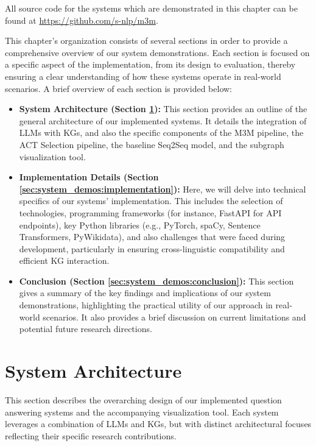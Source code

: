 All source code for the systems which are demonstrated in this chapter can be found at \url{https://github.com/s-nlp/m3m}.

This chapter's organization consists of several sections in order to provide a comprehensive overview of our system demonstrations. Each section is focused on a specific aspect of the implementation, from its design to evaluation, thereby ensuring a clear understanding of how these systems operate in real-world scenarios. A brief overview of each section is provided below:


\begin{itemize}
    \item \textbf{System Architecture (Section \ref{sec:system_demos:architecture}):} This section provides an outline of the general architecture of our implemented systems. It details the integration of LLMs with KGs, and also the specific components of the M3M pipeline, the ACT Selection pipeline, the baseline Seq2Seq model, and the subgraph visualization tool.
    \item \textbf{Implementation Details (Section \ref{sec:system_demos:implementation}):} Here, we will delve into technical specifics of our systems' implementation. This includes the selection of technologies, programming frameworks (for instance, FastAPI for API endpoints), key Python libraries (e.g., PyTorch, spaCy, Sentence Transformers, PyWikidata), and also challenges that were faced during development, particularly in ensuring cross-linguistic compatibility and efficient KG interaction.
    \item \textbf{Conclusion (Section \ref{sec:system_demos:conclusion}):} This section gives a summary of the key findings and implications of our system demonstrations, highlighting the practical utility of our approach in real-world scenarios. It also provides a brief discussion on current limitations and potential future research directions.
\end{itemize}

\section{System Architecture}
\label{sec:system_demos:architecture}
This section describes the overarching design of our implemented question answering systems and the accompanying visualization tool. Each system leverages a combination of LLMs and KGs, but with distinct architectural focuses reflecting their specific research contributions.

